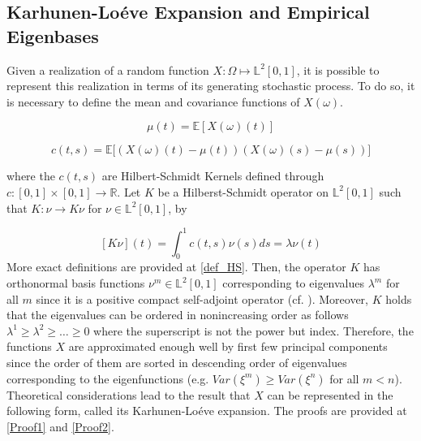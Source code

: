 \documentclass[11pt,twoside,a4paper]{article}
\begin{document}
	\subsection{Karhunen-Lo\'{e}ve Expansion and Empirical Eigenbases}\hypertarget{KL}{}
	Given a realization of a random function $X: \Omega \mapsto \mathbb{L}^2[0,1]$, it is possible to represent this realization in terms of its generating stochastic process. To do so, it is necessary to define the mean and covariance functions of $X(\omega)$.
	
	\begin{equation}\label{MeanFunction}
		\mu(t) = \mathbb{E}\left[ X(\omega)(t) \right]
	\end{equation}
	
	\begin{equation}\label{CovarianceFunction}
		c(t,s) = \mathbb{E}\big[ \left( X(\omega)(t) - \mu(t) \right) \left( X(\omega)(s) - \mu(s) \right) \big]
	\end{equation}

	where the $c(t,s)$ are Hilbert-Schmidt Kernels defined through $c : [0,1] \times [0,1] \rightarrow \mathbb{R}$. Let $K$ be a Hilberst-Schmidt operator on $\mathbb{L}^{2}[0,1]$ such that $K : \nu \rightarrow K \nu$ for $\nu \in \mathbb{L}^{2}[0,1]$, by
	
	\begin{equation}\label{HSKernal}
		[K \nu](t) = \int_{0}^{1}c(t,s) \nu(s)ds = \lambda \nu(t)
	\end{equation}
	More exact definitions are provided at \ref{def_HS}. Then, the operator $K$ has orthonormal basis functions $\nu^{m} \in \mathbb{L}^{2}[0,1]$ corresponding to eigenvalues $\lambda^{m}$ for all $m$ since it is a positive compact self-adjoint operator (cf. \cite{alexanderian_KLexpansion_2015}). Moreover, $K$ holds that the eigenvalues can be ordered in nonincreasing order as follows $\lambda^{1} \geq \lambda^{2} \geq \dots \geq 0$ where the superscript is not the power but index. Therefore, the functions $X$ are approximated enough well by first few principal components since the order of them are sorted in descending order of eigenvalues corresponding to the eigenfunctions (e.g. $Var(\xi^{m}) \geq Var(\xi^{n})$ for all $m < n$). Theoretical considerations lead to the result that $X$ can be represented in the following form, called its Karhunen-Lo\'{e}ve expansion. The proofs are provided at \ref{Proof1} and \ref{Proof2}.
	
\end{document}
